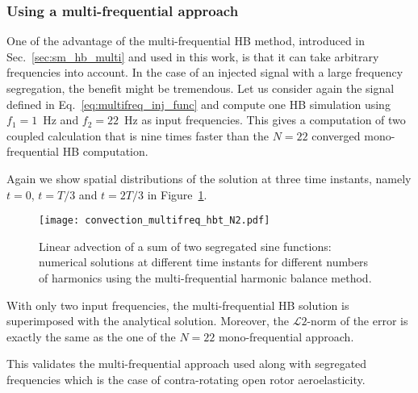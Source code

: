 \subsubsection{Using a multi-frequential approach}

One of the advantage of the multi-frequential HB method, 
introduced in Sec.~\ref{sec:sm_hb_multi}
and used in this work, is that it can take arbitrary frequencies into account.
In the case of an injected signal with a large frequency segregation, the
benefit might be tremendous. Let us consider again the signal defined in 
Eq.~\eqref{eq:multifreq_inj_func} and compute one HB simulation using 
$f_1=1$~Hz and $f_2=22$~Hz as input frequencies. This gives a computation
of two coupled calculation
that is nine times faster than the $N=22$ converged mono-frequential
HB computation. 

Again
we show spatial distributions of the solution
at three time instants, namely $t=0$, $t=T/3$ and $t=2T/3$
in Figure~\ref{fig:inj_multifreq_hb}.
\begin{figure}[htp]
  \centering
  \texttt{[image: convection\_multifreq\_hbt\_N2.pdf]}
  \caption{Linear advection of a sum of two segregated sine functions: 
  numerical solutions at different time instants for different numbers of harmonics using the
  multi-frequential harmonic balance method.}
  \label{fig:inj_multifreq_hb}
\end{figure}
With only two input frequencies, the multi-frequential
HB solution is superimposed with the analytical solution.
Moreover, the $\mathcal{L}2$-norm of the error is 
exactly the same as the one of the $N=22$ mono-frequential
approach.

This validates the multi-frequential approach 
used along with segregated frequencies which is 
the case of contra-rotating open rotor aeroelasticity.

